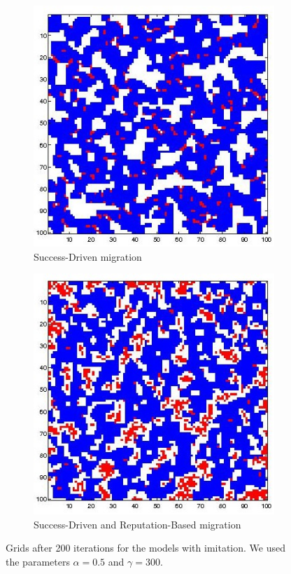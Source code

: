 \documentclass[11pt]{article}
\begin{document}
\begin{figure}[H]
	\begin{subfigure}[t]{0.26\textwidth}
        \includegraphics[width=\textwidth]{../../other/grids/m2-t200-a5-g300.jpg}
	\caption{Success-Driven migration}
	\label{fig:grids_imitation2}
    	\end{subfigure}
	\begin{subfigure}[t]{0.26\textwidth}
        \includegraphics[width=\textwidth]{../../other/grids/m6-t200-a5-g300.jpg}
	\caption{Success-Driven and Reputation-Based migration}
	\label{fig:grids_imitation6}
    	\end{subfigure}

	\caption{Grids after 200 iterations for the models with imitation. We used the parameters $\alpha = 0.5$ and $\gamma = 300$.}
	\label{fig:grids_imitation}
\end{figure}
\end{document}
